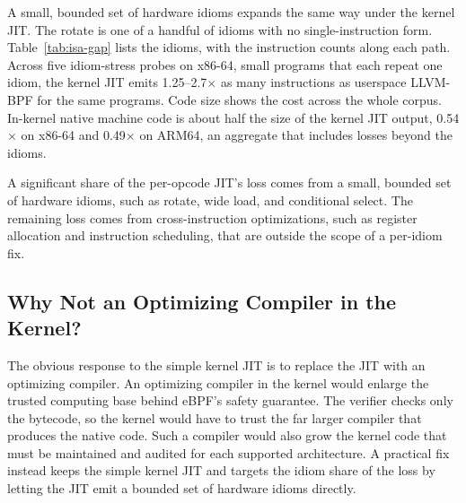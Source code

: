 

A small, bounded set of hardware idioms expands the same way under the kernel JIT.
The rotate is one of a handful of idioms with no single-instruction form.
Table~\ref{tab:isa-gap} lists the idioms, with the instruction counts along each path.
Across five idiom-stress probes on x86-64, small programs that each repeat one idiom, the kernel JIT emits 1.25--2.7$\times$ as many instructions as userspace LLVM-BPF for the same programs.
Code size shows the cost across the whole corpus.
In-kernel native machine code is about half the size of the kernel JIT output, 0.54$\times$ on x86-64 and 0.49$\times$ on ARM64, an aggregate that includes losses beyond the idioms.

\begin{finding}
\finlabel A significant share of the per-opcode JIT's loss comes from a small, bounded set of hardware idioms, such as rotate, wide load, and conditional select. The remaining loss comes from cross-instruction optimizations, such as register allocation and instruction scheduling, that are outside the scope of a per-idiom fix.
\end{finding}



\subsection{Why Not an Optimizing Compiler in the Kernel?}
\label{subsec:char-challenges}

The obvious response to the simple kernel JIT is to replace the JIT with an optimizing compiler.
An optimizing compiler in the kernel would enlarge the trusted computing base behind eBPF's safety guarantee.
The verifier checks only the bytecode, so the kernel would have to trust the far larger compiler that produces the native code.
Such a compiler would also grow the kernel code that must be maintained and audited for each supported architecture.
A practical fix instead keeps the simple kernel JIT and targets the idiom share of the loss by letting the JIT emit a bounded set of hardware idioms directly.

